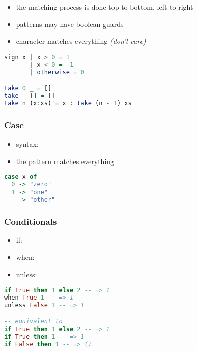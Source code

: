 \documentclass[a4paper,landscape,10pt]{article}
\begin{document}
\begin{multicols*}{2}
  \begin{itemize}
    \item the matching process is done top to bottom, left to right
    \item patterns may have boolean guards
    \item character \ihaskell{_} matches everything \textit{(don't care)}
  \end{itemize}

  \begin{lstlisting}[language=Haskell]
sign x | x > 0 = 1
       | x < 0 = -1
       | otherwise = 0

take 0 _ = []
take _ [] = []
take n (x:xs) = x : take (n - 1) xs
\end{lstlisting}

  \breakcolumn

  \subsubsection{Case}

  \begin{itemize}
    \item syntax: 
    \item the \ihaskell{_} pattern matches everything
  \end{itemize}

  \begin{lstlisting}[language=Haskell]
case x of
  0 -> "zero"
  1 -> "one"
  _ -> "other"
\end{lstlisting}

  \subsubsection{Conditionals}

  \begin{itemize}
    \item if: 
    \item when: 
    \item unless: 
  \end{itemize}

  \begin{lstlisting}[language=Haskell]
if True then 1 else 2 -- => 1
when True 1 -- => 1
unless False 1 -- => 1

-- equivalent to
if True then 1 else 2 -- => 1
if True then 1 -- => 1
if False then 1 -- => ()


\end{lstlisting}
\end{multicols*}
\end{document}
